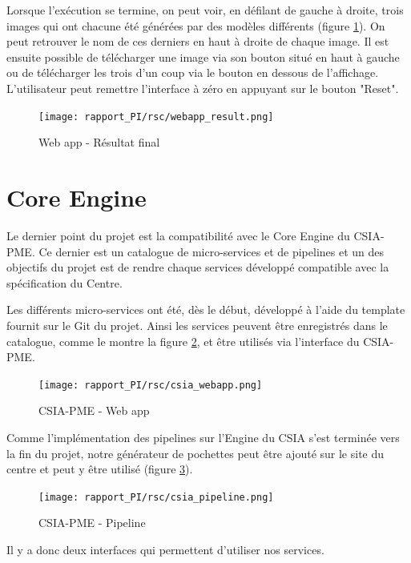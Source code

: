 Lorsque l'exécution se termine, on peut voir, en défilant de gauche à droite, trois images qui ont chacune été générées par des modèles différents (figure \ref{fig:webapp_result}). On peut retrouver le nom de ces derniers en haut à droite de chaque image. Il est ensuite possible de télécharger une image via son bouton situé en haut à gauche ou de télécharger les trois d'un coup via le bouton en dessous de l'affichage. L'utilisateur peut remettre l'interface à zéro en appuyant sur le bouton "Reset".

\begin{figure}[H]
    \begin{center}
        \texttt{[image: rapport\_PI/rsc/webapp\_result.png]}
        \caption{Web app - Résultat final}
        \label{fig:webapp_result}
    \end{center}
\end{figure}

\section{Core Engine}

Le dernier point du projet est la compatibilité avec le Core Engine du CSIA-PME. Ce dernier est un catalogue de micro-services et de pipelines et un des objectifs du projet est de rendre chaque services développé compatible avec la spécification du Centre.

Les différents micro-services ont été, dès le début, développé à l'aide du template fournit sur le Git du projet. Ainsi les services peuvent être enregistrés dans le catalogue, comme le montre la figure \ref{fig:csia_webapp}, et être utilisés via l'interface du CSIA-PME.

\begin{figure}[H]
    \begin{center}
        \texttt{[image: rapport\_PI/rsc/csia\_webapp.png]}
        \caption{CSIA-PME - Web app}
        \label{fig:csia_webapp}
    \end{center}
\end{figure}

Comme l'implémentation des pipelines sur l'Engine du CSIA s'est terminée vers la fin du projet, notre générateur de pochettes peut être ajouté sur le site du centre et peut y être utilisé (figure \ref{fig:csia_pipeline}).

\begin{figure}[H]
    \begin{center}
        \texttt{[image: rapport\_PI/rsc/csia\_pipeline.png]}
        \caption{CSIA-PME - Pipeline}
        \label{fig:csia_pipeline}
    \end{center}
\end{figure}

Il y a donc deux interfaces qui permettent d'utiliser nos services.